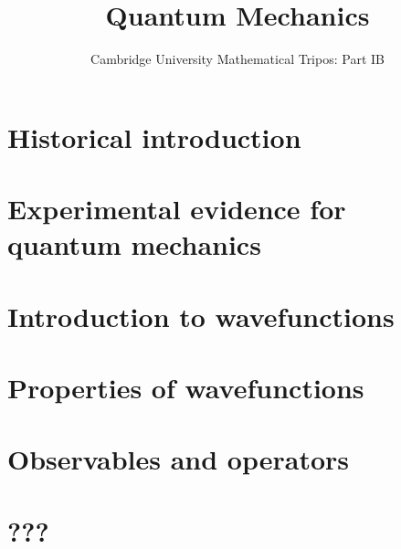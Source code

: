 \documentclass{article}
\title{Quantum Mechanics}
\author{Cambridge University Mathematical Tripos: Part IB}
\begin{document}
\maketitle

\tableofcontentsnewpage{}

\section{Historical introduction}

\section{Experimental evidence for quantum mechanics}

\section{Introduction to wavefunctions}

\section{Properties of wavefunctions}

\section{Observables and operators}

\section{???}

\end{document}
